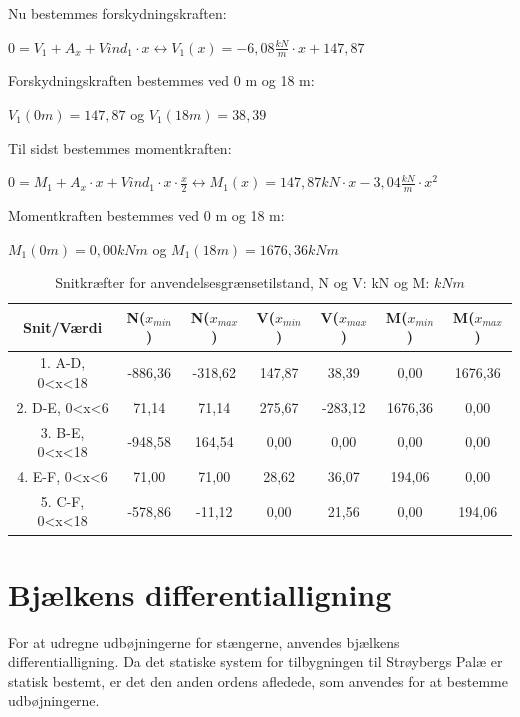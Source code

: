 Nu bestemmes forskydningskraften:
\begin{center}
	$0 = V_1 + A_x + Vind_1 \cdot x \leftrightarrow V_1(x) = -6,\!08 \frac{kN}{m} \cdot x + 147,\!87$
\end{center}

Forskydningskraften bestemmes ved 0 m og 18 m:
\begin{center}
	$V_1(0m) = 147,\!87$ og $V_1(18m) = 38,\!39$
\end{center}

Til sidst bestemmes momentkraften:
\begin{center}
	$0 = M_1 + A_x \cdot x + Vind_1\cdot x\cdot \frac{x}{2} \leftrightarrow M_1(x) = 147,\!87 kN\cdot x - 3,\!04 \frac{kN}{m}\cdot x^2$
\end{center}

Momentkraften bestemmes ved 0 m og 18 m:
\begin{center}
	$M_1(0m) = 0,\!00 kNm$ og $M_1(18m) = 1676,\!36 kNm$
\end{center}

\begin{table}
	\begin{center}
		\begin{tabular}{|c|c|c|c|c|c|c|}
			\hline
			Snit/Værdi & N($x_{min}$) & N($x_{max}$) & V($x_{min}$) & V($x_{max}$) & M($x_{min}$) & M($x_{max}$) 	\\ \hline
			1. A-D, 0<x<18 	& -886,36 	& -318,62 	&  147,87 	&  38,39 	&  0,00     &  1676,36        		\\ \hline
			2. D-E, 0<x<6  	&  71,14    &  71,14    &  275,67   & -283,12   &  1676,36  &  0,00    \\ \hline
			3. B-E, 0<x<18  & -948,58   &  164,54   &  0,00     &  0,00     &  0,00     &  0,00 			    \\ \hline
			4. E-F, 0<x<6   &  71,00    &  71,00    &  28,62    &  36,07    &  194,06   &  0,00     \\ \hline
			5. C-F, 0<x<18     & -578,86   & -11,12    &  0,00     &  21,56    &  0,00     &  194,06       		\\ \hline
		\end{tabular}
		\caption{Snitkræfter for anvendelsesgrænsetilstand, N og V: kN og M: $kNm$}
		\label{tab:anden2}
	\end{center}
\end{table}

\section{Bjælkens differentialligning}
For at udregne udbøjningerne for stængerne, anvendes bjælkens differentialligning. Da det statiske system for tilbygningen til Strøybergs Palæ er statisk bestemt, er det den anden ordens afledede, som anvendes for at bestemme udbøjningerne.